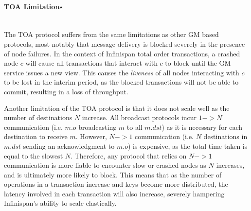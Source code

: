 	        \paragraph{TOA Limitations} \hspace{0pt} \\
			The TOA protocol suffers from the same limitations as other GM based protocols, most notably that message delivery is blocked severely in the presence of node failures.  In the context of Infinispan total order transactions, a crashed node $c$ will cause all transactions that interact with $c$ to block until the GM service issues a new view.  This causes the \emph{liveness} of all nodes interacting with $c$ to be lost in the interim period, as the blocked transactions will not be able to commit, resulting in a loss of throughput.  
	        
	        Another limitation of the TOA protocol is that it does not scale well as the number of destinations $N$ increase.  All broadcast protocols incur $1->N$ communication (i.e. $m.o$ broadcasting $m$ to all $m.dst$) as it is necessary for each destination to receive $m$.  However, $N->1$ communication (i.e. $N$ destinations in $m.dst$ sending an acknowledgment to $m.o$) is expensive, as the total time taken is equal to the slowest $N$.  Therefore, any protocol that relies on $N->1$ communication is more liable to encounter slow or crashed nodes as $N$ increases, and is ultimately more likely to block.  This means that as the number of operations in a transaction increase and keys become more distributed, the latency involved in each transaction will also increase, severely hampering Infinispan's ability to scale elastically.  
	        


%
